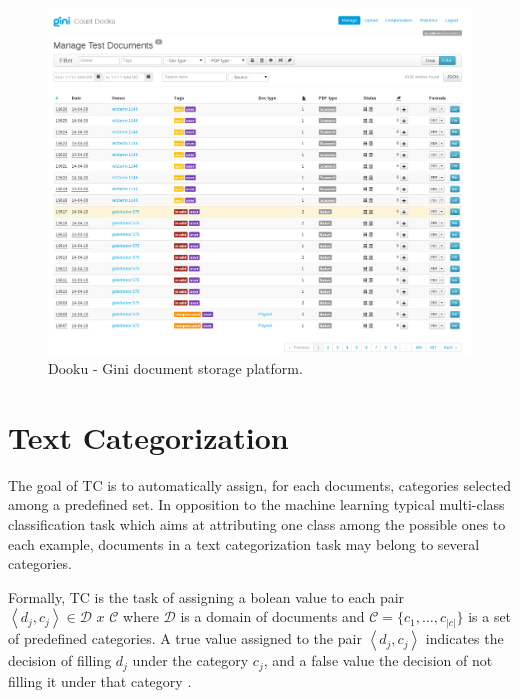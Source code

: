 \begin{figure}[h]
    \centering
    \includegraphics[width=\textwidth]{images/001-dooku-screenshot.png}
    \caption{Dooku - Gini document storage platform.}
    \label{fig:dooku_screenshot}
\end{figure}



\section{Text Categorization}
\label{sec:rel_text_categorization}

The goal of \ac{TC} is to automatically assign, for each
documents, categories selected among a predefined set.
In opposition to the machine learning typical multi-class classification
task which aims at attributing one class among the possible ones to each
example, documents in a text categorization task may belong to several
categories. 


Formally,  \ac{TC} is the  task of  assigning a bolean value to each pair 
$\left\langle d_{j},c_{j}\right\rangle \in\mathcal{D}\,\, x\,\mathcal{\, C}$
where  $\mathcal{D}$  is a domain of documents and
$\mathcal{C}=\{c_{1},\ldots,c_{|c|}\}$ is a set of predefined categories. A
true value assigned to the pair $\left\langle d_{j},c_{j}\right\rangle $
indicates the decision of filling  $d_{j}$ under the category  $c_{j}$, and
a false value the decision of not filling it under that category \cite{Sebastiani02}. 


